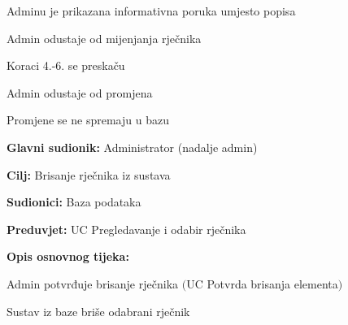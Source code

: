 \begin{packed_item}
\begin{packed_item}
\begin{packed_enum}
			\item Adminu je prikazana informativna poruka umjesto popisa
			\item Admin odustaje od mijenjanja rječnika
			\item Koraci 4.-6. se preskaču
			
		\end{packed_enum}

		\item[5.a] Admin odustaje od promjena
		\item[] \begin{packed_enum}
			
			\item Promjene se ne spremaju u bazu
			
		\end{packed_enum}
		
	\end{packed_item}

\end{packed_item}
					

\noindent {}
\begin{packed_item}

	\item \textbf{Glavni sudionik:} Administrator (nadalje admin)
	\item  \textbf{Cilj:} Brisanje rječnika iz sustava
	\item  \textbf{Sudionici:} Baza podataka
	\item  \textbf{Preduvjet:} UC Pregledavanje i odabir rječnika
	\item  \textbf{Opis osnovnog tijeka:}
	
	\item[] \begin{packed_enum}

		\item Admin potvrđuje brisanje rječnika $($UC Potvrda brisanja elementa$)$
		\item Sustav iz baze briše odabrani rječnik
	\end{packed_enum}

\end{packed_item}

